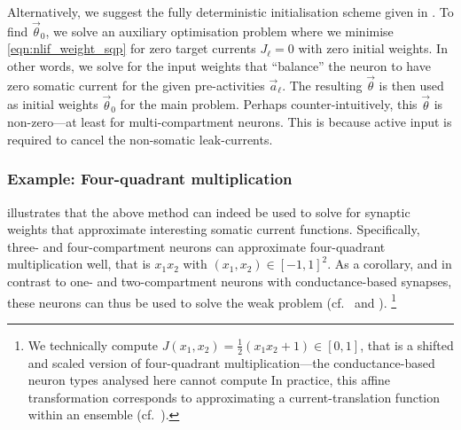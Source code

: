 Alternatively, we suggest the fully deterministic initialisation scheme given in .
To find $\vec \theta_0$, we solve an auxiliary optimisation problem where we minimise \cref{eqn:nlif_weight_sqp} for zero target currents $J_\ell = 0$ with zero initial weights.
In other words, we solve for the input weights that \enquote{balance} the neuron to have zero somatic current for the given pre-activities $\vec a_\ell$.
The resulting $\vec \theta$ is then used as initial weights $\vec \theta_0$ for the main problem.
Perhaps counter-intuitively, this $\vec \theta$ is non-zero---at least for multi-compartment neurons.	
This is because active input is required to cancel the non-somatic leak-currents.


\subsubsection{Example: Four-quadrant multiplication}

 illustrates that the above method can indeed be used to solve for synaptic weights that approximate interesting somatic current functions.
Specifically, three- and four-compartment neurons can approximate four-quadrant multiplication well, that is $x_1 x_2$ with $(x_1, x_2) \in [-1, 1]^2$.
As a corollary, and in contrast to one- and two-compartment neurons with conductance-based synapses, these neurons can thus be used to solve the weak \XOR problem (cf.~ and ).%
\footnote{We technically compute $J(x_1, x_2) = \frac{1}2 (x_1 x_2 + 1) \in [0, 1]$, that is a shifted and scaled version of four-quadrant multiplication---the conductance-based neuron types analysed here cannot compute 
In practice, this affine transformation corresponds to approximating a current-translation function within an \NEF ensemble (cf.~).
}

